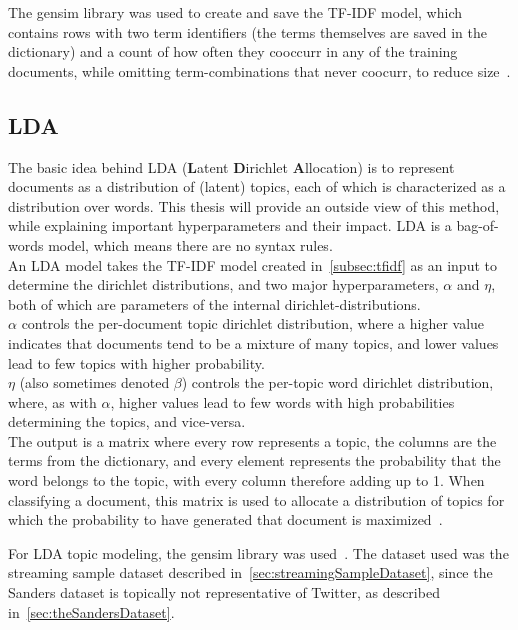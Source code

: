 The gensim library was used to create and save the TF-IDF model,
which contains rows with two term identifiers (the terms themselves are saved in the dictionary) and a count of how often
they cooccurr in any of the training documents, while omitting term-combinations that never coocurr, to reduce size~\cite{gensimDocs}.

\subsection{LDA}
\label{subsec:lda}

The basic idea behind LDA (\textbf{L}atent \textbf{D}irichlet \textbf{A}llocation) is to represent documents as a distribution of (latent) topics,
each of which is characterized as a distribution over words.
This thesis will provide an outside view of this method, while explaining important hyperparameters and their impact.
LDA is a bag-of-words model, which means there are no syntax rules.\\
An LDA model takes the TF-IDF model created in~\cref{subsec:tfidf} as an input to determine the dirichlet distributions,
and two major hyperparameters, $\alpha$ and $\eta$,
both of which are parameters of the internal dirichlet-distributions.\\
$\alpha$ controls the per-document topic dirichlet distribution,
where a higher value indicates that documents tend to be a mixture of many topics,
and lower values lead to few topics with higher probability.\\
$\eta$ (also sometimes denoted $\beta$) controls the per-topic word dirichlet distribution, where, as with $\alpha$,
higher values lead to few words with high probabilities determining the topics,
and vice-versa.\\
The output is a matrix where every row represents a topic,
the columns are the terms from the dictionary,
and every element represents the probability that the word belongs to the topic,
with every column therefore adding up to 1.
When classifying a document, this matrix is used to allocate a distribution of topics for which the probability to have generated that document is maximized~\cite{Blei2003}.

For LDA topic modeling, the gensim library was used~\cite{gensimDocs}.
The dataset used was the streaming sample dataset described in~\cref{sec:streamingSampleDataset},
since the Sanders dataset is topically not representative of Twitter, as described in~\cref{sec:theSandersDataset}.

